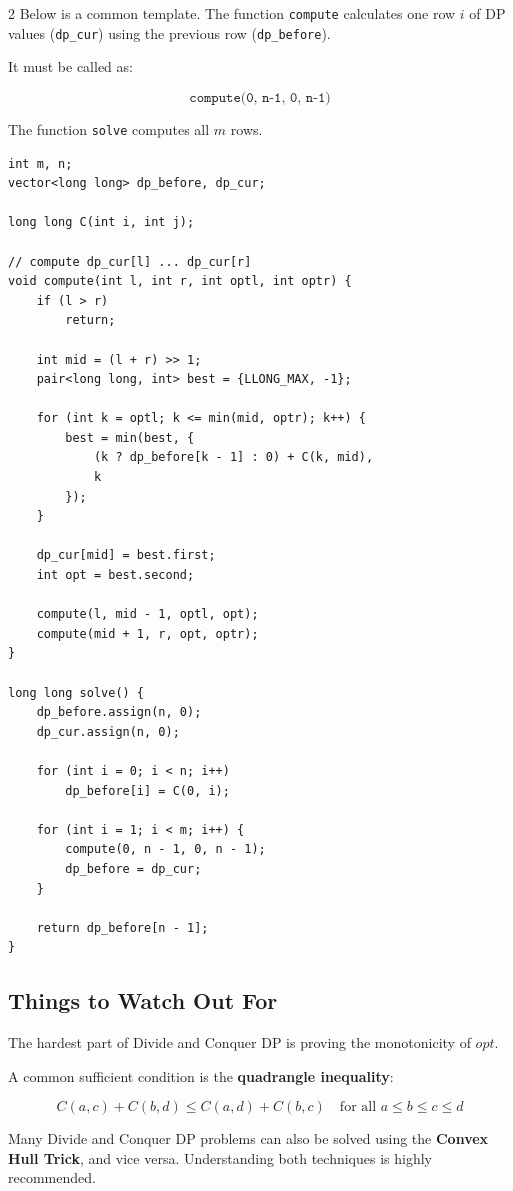 \documentclass[a4paper,landscape]{article}
\begin{document}
\begin{multicols}{2}
Below is a common template.  
The function \texttt{compute} calculates one row \( i \) of DP values (\texttt{dp\_cur})  
using the previous row (\texttt{dp\_before}).  

It must be called as:

\[
\texttt{compute(0, n-1, 0, n-1)}
\]

The function \texttt{solve} computes all \( m \) rows.

\begin{lstlisting}
int m, n;
vector<long long> dp_before, dp_cur;

long long C(int i, int j);

// compute dp_cur[l] ... dp_cur[r]
void compute(int l, int r, int optl, int optr) {
    if (l > r)
        return;

    int mid = (l + r) >> 1;
    pair<long long, int> best = {LLONG_MAX, -1};

    for (int k = optl; k <= min(mid, optr); k++) {
        best = min(best, {
            (k ? dp_before[k - 1] : 0) + C(k, mid),
            k
        });
    }

    dp_cur[mid] = best.first;
    int opt = best.second;

    compute(l, mid - 1, optl, opt);
    compute(mid + 1, r, opt, optr);
}

long long solve() {
    dp_before.assign(n, 0);
    dp_cur.assign(n, 0);

    for (int i = 0; i < n; i++)
        dp_before[i] = C(0, i);

    for (int i = 1; i < m; i++) {
        compute(0, n - 1, 0, n - 1);
        dp_before = dp_cur;
    }

    return dp_before[n - 1];
}
\end{lstlisting}

\subsection*{Things to Watch Out For}

The hardest part of Divide and Conquer DP is proving the monotonicity of \( opt \).

A common sufficient condition is the \textbf{quadrangle inequality}:

\[
C(a, c) + C(b, d) \le C(a, d) + C(b, c)
\quad \text{for all } a \le b \le c \le d
\]

Many Divide and Conquer DP problems can also be solved using the  
\textbf{Convex Hull Trick}, and vice versa.  
Understanding both techniques is highly recommended.
\hline

\end{multicols}
\end{document}
